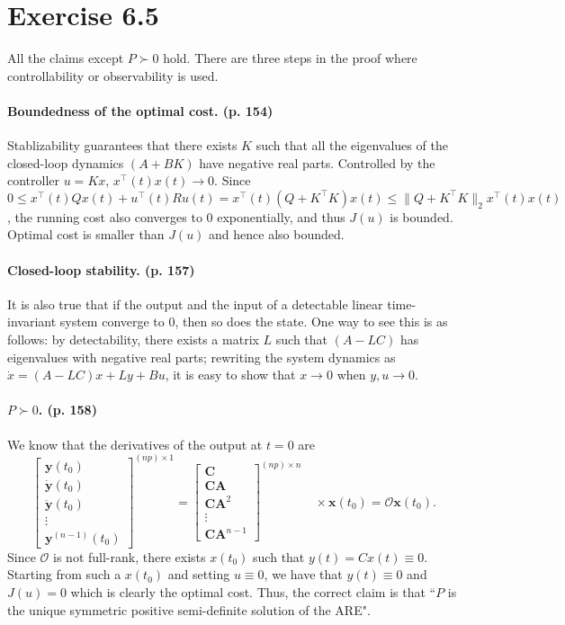 \documentclass[11pt]{report}
\newcommand{\T}{\intercal}
\begin{document}
\section*{Exercise 6.5}
All the claims except $P \succ 0$ hold. There are three steps in the proof where controllability or observability is used.

\paragraph{Boundedness of the optimal cost. (p. 154)} Stablizability guarantees that there exists $K$ such that all the eigenvalues of the closed-loop dynamics $(A+BK)$ have negative real parts. Controlled by the controller $u = Kx$, $x^\T(t)x(t) \to 0$. Since $0 \leq x^\T(t)Qx(t) + u^\T(t)Ru(t) = x^\T(t)(Q+K^\T K)x(t) \leq \|Q+K^\T K\|_2 x^\T(t)x(t)$, the running cost also converges to $0$ exponentially, and thus $J(u)$ is bounded. Optimal cost is smaller than $J(u)$ and hence also bounded.

\paragraph{Closed-loop stability. (p. 157)} It is also true that if the output and the input of a detectable linear time-invariant system converge to $0$, then so does the state. One way to see this is as follows:
by detectability, there exists a matrix $L$ such that $(A - LC)$ has eigenvalues with negative real parts; rewriting the system dynamics as $\dot{x} = (A - LC)x + Ly + Bu$, it is easy to show that $x \to 0$ when $y, u \to 0$.

\paragraph{$P \succ 0$. (p. 158)} We know that the derivatives of the output at $t=0$ are
\[
\left[\begin{array}{c}
\mathbf{y}\left(t_{0}\right) \\
\dot{\mathbf{y}}\left(t_{0}\right) \\
\ddot{\mathbf{y}}\left(t_{0}\right) \\
\vdots \\
\mathbf{y}^{(n-1)}\left(t_{0}\right)
\end{array}\right]^{(n p) \times 1}=\left[\begin{array}{c}
\mathbf{C} \\
\mathbf{C A} \\
\mathbf{C A}^{2} \\
\vdots \\
\mathbf{C A}^{n-1}
\end{array}\right]^{(n p) \times n} \quad \times \mathbf{x}\left(t_{0}\right)=\mathcal{O} \mathbf{x}\left(t_{0}\right).
\]
Since $\mathcal{O}$ is not full-rank, there exists $x(t_0)$ such that $y(t) = Cx(t) \equiv 0$. Starting from such a $x(t_0)$ and setting $u \equiv 0$, we have that $y(t) \equiv 0$ and $J(u) = 0$ which is clearly the optimal cost. Thus, the correct claim is that ``$P$ is the unique symmetric positive semi-definite solution of the ARE".
\end{document}
